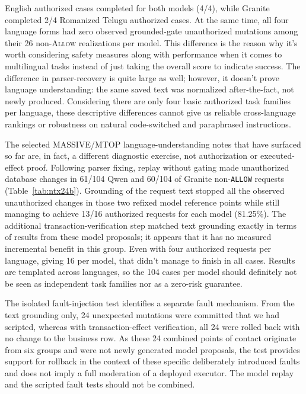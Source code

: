 \documentclass[pdflatex,sn-nature]{sn-jnl}
\newcommand{\allow}{\textsc{Allow}\xspace}
\begin{document}
English authorized cases completed for both models (4/4), while Granite completed 2/4 Romanized Telugu authorized cases. At the same time, all four language forms had zero observed grounded-gate unauthorized mutations among their 26 non-\allow realizations per model. This‌ difference is the reason why it's worth considering safety measures along with performance when it comes to multilingual tasks instead of just taking the overall score to indicate success. The difference in parser-recovery is quite large as well; however, it doesn't prove language understanding: the same saved text was normalized after-the-fact, not newly produced. Considering there are only four basic authorized task families per language, these descriptive differences cannot give us reliable cross-language rankings or robustness on natural code-switched and paraphrased instructions.

The selected MASSIVE/MTOP language-understanding notes that have surfaced so far are, in fact, a different diagnostic exercise, not authorization or executed-effect proof. Following parser fixing, replay without gating made unauthorized database changes in 61/104 Qwen and 60/104 of Granite non-\texttt{ALLOW} requests (Table~\ref{tab:ntx24b}). Grounding of the request text stopped all the observed unauthorized changes in those two refixed model reference points while still managing to achieve 13/16 authorized requests for each model (81.25\%). The additional transaction-verification step matched text grounding exactly in terms of results from these model proposals; it appears that it has no measured incremental benefit in this group. Even with four authorized requests per language, giving 16 per model, that didn't manage to finish in all cases. Results are templated across languages, so the 104 cases per model should definitely not be seen as independent task families nor as a zero-risk guarantee.



The isolated fault-injection test identifies a separate fault mechanism.
From the text grounding only, 24 unexpected mutations were committed that we had scripted, whereas with transaction-effect verification, all 24 were rolled back with no change to the business row. As these 24 combined points of contact originate from six groups and were not newly generated model proposals, the test provides support for rollback in the context of these specific deliberately introduced faults and does not imply a full moderation of a deployed executor. The model replay and the scripted fault tests should not be combined.
\end{document}

